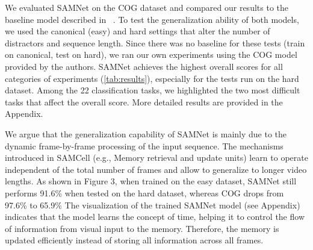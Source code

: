 We evaluated SAMNet on the COG dataset and compared our results to the baseline model described in ~\cite{yang2018dataset}. To test the generalization ability of both models, we used the canonical (easy) and hard settings that alter the number of distractors and sequence length.  Since there was no baseline for these tests (train on canonical, test on hard), we ran our own experiments using the COG model provided by the authors.  SAMNet achieves the highest overall scores for all categories of experiments (\cref{tab:results}), especially for the tests run on the hard dataset.  Among the 22 classification tasks, we highlighted the two most difficult tasks that affect the overall score.  More detailed results are provided in the Appendix.

We argue that the generalization capability of SAMNet is mainly due to the dynamic frame-by-frame processing of the input sequence.  The mechanisms introduced in SAMCell (e.g., Memory retrieval and update units) learn to operate independent of the total number of frames and allow to generalize to longer video lengths. As shown in Figure 3, when trained on the easy dataset, SAMNet still performs 91.6\% when tested on the hard dataset, whereas COG drops from 97.6\% to 65.9\%   The visualization of the trained SAMNet model (see Appendix) indicates that the model learns the concept of time, helping it to control the flow of information from visual input to the memory.  Therefore, the memory is updated efficiently instead of storing all information across all frames.


%





